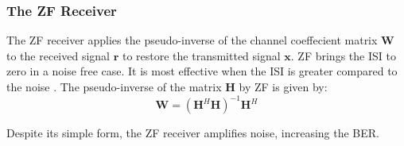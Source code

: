 \documentclass[11pt]{report}
\renewcommand{\vec}[1]{\mathbf{#1}} %
\begin{document}
\subsubsection{The ZF Receiver}
\label{subsub:zf}
The ZF receiver applies the pseudo-inverse of the channel coeffecient matrix $\vec{W}$ to the received signal $\vec{r}$ to restore the transmitted signal $\vec{x}$. ZF brings the ISI to zero in a noise free case. It is most effective when the ISI is greater compared to the noise \cite{46}. The pseudo-inverse of the matrix $\vec{H}$  by ZF is given by:
\begin{equation}
\label{eq:zf}
\vec{W} = (\vec{H}^H\vec{H})^{-1}\vec{H}^H
\end{equation}

Despite its simple form, the ZF receiver amplifies noise, increasing the BER.


\end{document}
